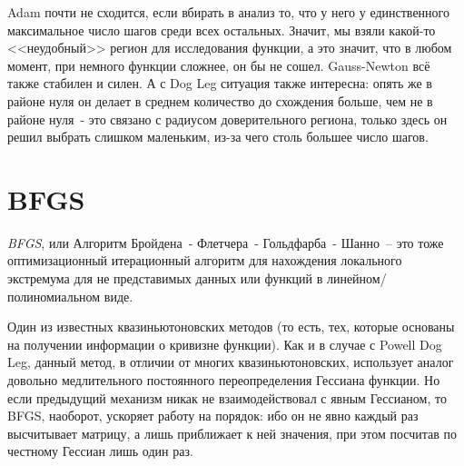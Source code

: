 \documentclass[12pt, a4paper, oneside, final]{article}
\begin{document}
	Adam почти не сходится, если вбирать в анализ то, что у него у единственного максимальное число шагов среди всех остальных.
	Значит, мы взяли какой-то <<неудобный>> регион для исследования функции, а это значит, что в любом момент, при немного функции сложнее, он бы не сошел.
	Gauss-Newton всё также стабилен и силен.
	А с Dog Leg ситуация также интересна: опять же в районе нуля он делает в среднем количество до схождения больше, чем не в районе нуля~- это связано с радиусом доверительного региона, только здесь он решил выбрать слишком маленьким, из-за чего столь большее число шагов.
	\newpage
	\section*{BFGS}
	\textit{BFGS}, или Алгоритм Бройдена~- Флетчера~- Гольдфарба~- Шанно~-- это тоже оптимизационный итерационный алгоритм для нахождения локального экстремума для не представимых данных или функций в линейном/полиномиальном виде.

	Один из известных квазиньютоновских методов (то есть, тех, которые основаны на получении информации о кривизне функции).
	Как и в случае с Powell Dog Leg, данный метод, в отличии от многих квазиньютоновских, использует аналог довольно медлительного постоянного переопределения Гессиана функции.
	Но если предыдущий механизм никак не взаимодействовал с явным Гессианом, то BFGS, наоборот, ускоряет работу на порядок: ибо он не явно каждый раз высчитывает матрицу, а лишь приближает к ней значения, при этом посчитав по честному Гессиан лишь один раз.
\end{document}
